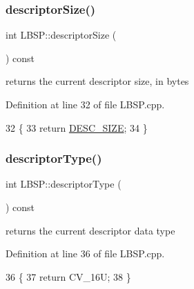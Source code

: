 \subsubsection{\texorpdfstring{descriptor\+Size()}{descriptorSize()}}
{\footnotesize\ttfamily int L\+B\+S\+P\+::descriptor\+Size (\begin{DoxyParamCaption}{ }\end{DoxyParamCaption}) const\hspace{0.3cm}{\ttfamily [virtual]}}



returns the current descriptor size, in bytes 



Definition at line 32 of file L\+B\+S\+P.\+cpp.


\begin{DoxyCode}
32                                \{
33     \textcolor{keywordflow}{return} \mbox{\hyperlink{class_l_b_s_p_a11167130ddc713921e5bbb0b628d5f74}{DESC\_SIZE}};
34 \}
\end{DoxyCode}
\mbox{\label{class_l_b_s_p_a36803a3126c171c945dcb35a1d43f421}} 
\subsubsection{\texorpdfstring{descriptor\+Type()}{descriptorType()}}
{\footnotesize\ttfamily int L\+B\+S\+P\+::descriptor\+Type (\begin{DoxyParamCaption}{ }\end{DoxyParamCaption}) const\hspace{0.3cm}{\ttfamily [virtual]}}



returns the current descriptor data type 



Definition at line 36 of file L\+B\+S\+P.\+cpp.


\begin{DoxyCode}
36                                \{
37     \textcolor{keywordflow}{return} CV\_16U;
38 \}
\end{DoxyCode}
\mbox{\label{class_l_b_s_p_a6412e6797415eaf34def8ec7a92dc7ab}} 
